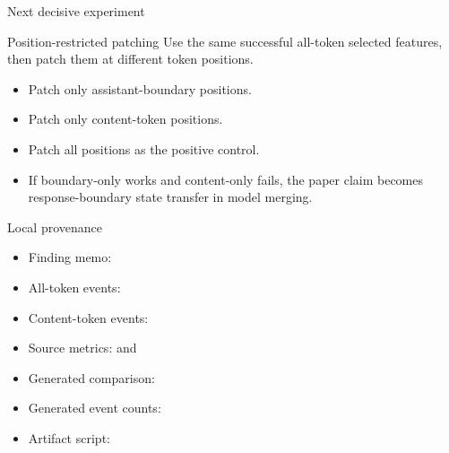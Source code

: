 \documentclass[aspectratio=169]{beamer}
\begin{document}
\begin{frame}{Next decisive experiment}
  \begin{block}{Position-restricted patching}
    Use the same successful all-token selected features, then patch them at different token positions.
  \end{block}
  \begin{itemize}
    \item Patch only assistant-boundary positions.
    \item Patch only content-token positions.
    \item Patch all positions as the positive control.
    \item If boundary-only works and content-only fails, the paper claim becomes response-boundary state transfer in model merging.
  \end{itemize}
\end{frame}

\begin{frame}{Local provenance}
  \scriptsize
  \begin{itemize}
    \item Finding memo: \texttt{}
    \item All-token events: \texttt{}
    \item Content-token events: \texttt{}
    \item Source metrics: \texttt{} and \texttt{}
    \item Generated comparison: \texttt{}
    \item Generated event counts: \texttt{}
    \item Artifact script: \texttt{}
  \end{itemize}
\end{frame}
\end{document}
